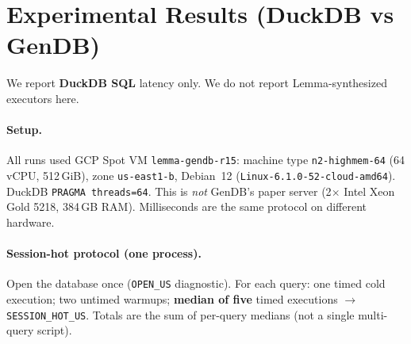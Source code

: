 %
%

\section{Experimental Results (DuckDB vs GenDB)}
\label{sec:eval-gendb-duckdb}

We report \textbf{DuckDB SQL} latency only. We do not report Lemma-synthesized
executors here.

\paragraph{Setup.}
All runs used GCP Spot VM \texttt{lemma-gendb-r15}: machine type
\texttt{n2-highmem-64} (64 vCPU, 512\,GiB), zone \texttt{us-east1-b}, Debian~12
(\texttt{Linux-6.1.0-52-cloud-amd64}). DuckDB \texttt{PRAGMA threads=64}.
This is \emph{not} GenDB's paper server (2$\times$ Intel Xeon Gold 5218,
384\,GB RAM). Milliseconds are the same protocol on different hardware.

\paragraph{Session-hot protocol (one process).}
Open the database once (\texttt{OPEN\_US} diagnostic). For each query: one
timed cold execution; two untimed warmups; \textbf{median of five} timed
executions $\rightarrow$ \texttt{SESSION\_HOT\_US}. Totals are the sum of
per-query medians (not a single multi-query script).

